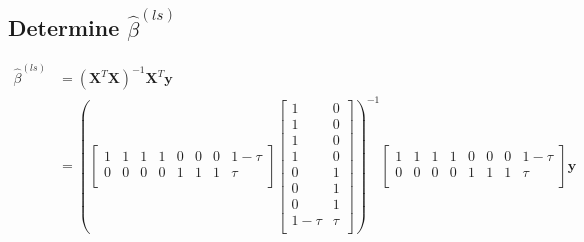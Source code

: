 \documentclass[a4paper]{article}
\begin{document}
\subsection{Determine $\hat{\beta}^{(ls)}$}
\begin{align*}
  \hat{\beta}^{(ls)} &= \left(\mathbf{X}^T\mathbf{X}\right)^{-1}\mathbf{X}^T\mathbf{y}\\
  &=\left(
      \begin{bmatrix}
        1 & 1 & 1 & 1 & 0 & 0 & 0 & 1-\tau\\
        0 & 0 & 0 & 0 & 1 & 1 & 1 & \tau\\
      \end{bmatrix}
      \begin{bmatrix}
        1 & 0 \\
        1 & 0 \\
        1 & 0 \\
        1 & 0 \\
        0 & 1 \\
        0 & 1 \\
        0 & 1 \\
        1-\tau & \tau\\
      \end{bmatrix}
    \right)^{-1}
    \begin{bmatrix}
      1 & 1 & 1 & 1 & 0 & 0 & 0 & 1-\tau\\
      0 & 0 & 0 & 0 & 1 & 1 & 1 & \tau\\
    \end{bmatrix}
    \mathbf{y}\\
\end{align*}
\end{document}
